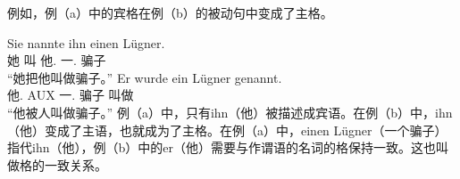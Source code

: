 例如，例（a）中的宾格在例（b）的被动句中变成了主格。

\eal
\ex 
\gll Sie nannte ihn einen Lügner.\\
	 她 叫 他.\acc{} 一.\acc{} 骗子\\
\glt “她把他叫做骗子。”
\ex 
\gll Er wurde ein Lügner genannt.\\
	 他.\nom{} AUX 一.\nom{} 骗子 叫做\\
\glt “他被人叫做骗子。”
\zl
例（a）中，只有ihn（他）被描述成宾语。在例（b）中，ihn（他）变成了主语，也就成为了主格。在例（a）中，einen Lügner（一个骗子）指代ihn（他），例（b）中的er（他）需要与作谓语的名词的格保持一致。这也叫做格的一致关系。

